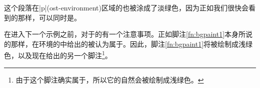 % 
% 
% 
% 
% 
% 
% 
% 
% 


这个段落在|p|(ost-environment)区域的\bground{}也被涂成了淡绿色，因为正如我们很快会看到的那样，\postenv{}可以同时是\preenv{}。\par\bigskip
% 
% 
% 

在进入下一个示例之前，对于\Mgfnote{}的\bgpaint{}有一个注意事项。正如脚注\ref{fn:bgpaint1}本身所说的那样，在环境的\lpage{}中给出的\Mgfnote{}被认为属于\postenv{}。因此，脚注\ref{fn:bgpaint1}将被绘制成浅绿色，以及现在给出的另一个脚注\footnote{由于这个脚注确实属于\postenv{}，所以它的\bground{}自然会被绘制成浅绿色。}。
% 
